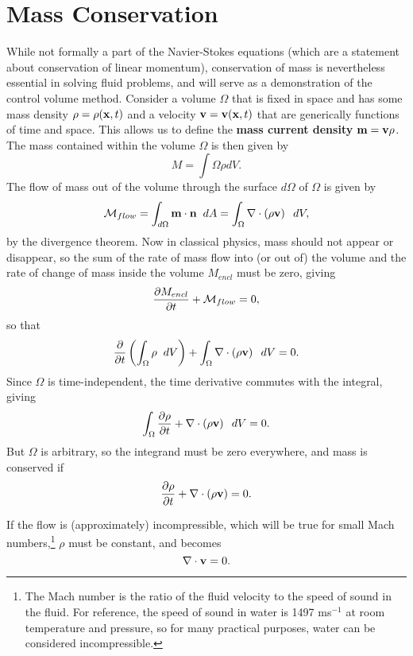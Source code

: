 \section{Mass Conservation}
While not formally a part of the Navier-Stokes equations (which are a statement about conservation of linear momentum), conservation of mass is nevertheless essential in solving fluid problems, and will serve as a demonstration of the control volume method. Consider a volume $\Omega$ that is fixed in space and has some mass density $\rho = \rho(\mathbf{x},t)$ and a velocity $\mathbf{v} = \mathbf{v}(\mathbf{x} ,t)$ that are generically functions of time and space. This allows us to define the {\bf mass current density} $\mathbf{m} = \mathbf{v}\rho$. The mass contained within the volume $\Omega$ is then given by 
\begin{equation}
M = \int{\Omega}{}{\rho}{dV}.
\end{equation}
The flow of mass out of the volume through the surface $d\Omega$ of $\Omega$ is given by 
\begin{equation}
\mathcal{M}_{flow} = \int{d\Omega}{}{\Vector{m}\cdot\Vector{n}}{dA} = \int{\Omega}{}{\Div{\paren{\rho\Vector{v}}}}{dV},
\end{equation}
by the divergence theorem.  Now in classical physics, mass should not appear or disappear, so the sum of the rate of mass flow into (or out of) the volume and the rate of change of mass inside the volume $M_{encl}$ must be zero, giving
\begin{equation}
\pder{1}{M_{encl}}{t} + \mathcal{M}_{flow} = 0,
\end{equation}
so that
\begin{equation}
\pder{1}{}{t}\paren{\int{\Omega}{}{\rho}{dV}} + \int{\Omega}{}{\Div{\paren{\rho\Vector{v}}}}{dV} =0.
\end{equation}
Since $\Omega$ is time-independent, the time derivative commutes with the integral, giving 
\begin{equation}
\int{\Omega}{}{\pder{1}{\rho}{t} + \Div{\paren{\rho\Vector{v}}}}{dV} = 0.
\end{equation}
But $\Omega$ is arbitrary, so the integrand must be zero everywhere, and mass is conserved if
\begin{equation}\label{eq:consMassFull}
\pder{1}{\rho}{t} + \Div{\paren{\rho\Vector{v}} }= 0.
\end{equation}

If the flow is (approximately) incompressible, which will be true for small Mach numbers,\footnote{The Mach number is the ratio of the fluid velocity to the speed of sound in the fluid. For reference, the speed of sound in water is 1497 ms$^{-1}$ at room temperature and pressure, so for many practical purposes, water can be considered incompressible.}  $\rho$ must be constant, and  becomes 
\begin{equation}\label{eq:consMassIncomp}
\nabla\cdot\mathbf{v} = 0.
\end{equation}

